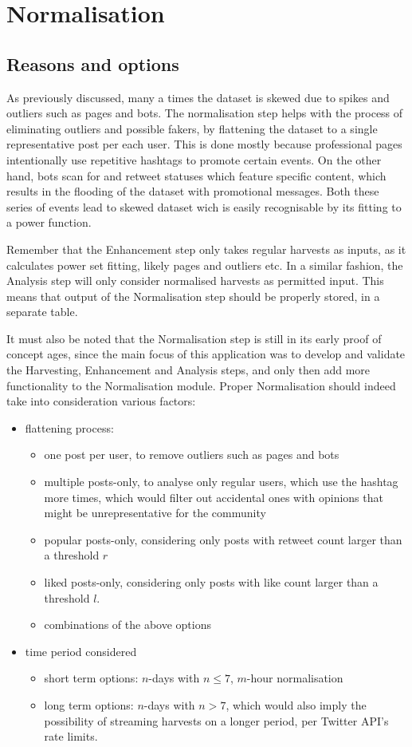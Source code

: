 \section{Normalisation}
\subsection{Reasons and options}
As previously discussed, many a times the dataset is skewed due to spikes and outliers such as pages and bots. The normalisation step helps with the process of eliminating outliers and possible fakers, by flattening the dataset to a single representative post per each user. This is done mostly because professional pages intentionally use repetitive hashtags to promote certain events. On the other hand, bots scan for and retweet statuses which feature specific content, which results in the flooding of the dataset with promotional messages. Both these series of events lead to skewed dataset wich is easily recognisable by its fitting to a power function.

Remember that the Enhancement step only takes regular harvests as inputs, as it calculates power set fitting, likely pages and outliers etc. In a similar fashion, the Analysis step will only consider normalised harvests as permitted input. This means that output of the Normalisation step should be properly stored, in a separate table.

It must also be noted that the Normalisation step is still in its early proof of concept ages, since the main focus of this application was to develop and validate the Harvesting, Enhancement and Analysis steps, and only then add more functionality to the Normalisation module. Proper Normalisation should indeed take into consideration various factors:

\begin{itemize}
\item flattening process: 
\begin{itemize}
\item one post per user, to remove outliers such as pages and bots
\item multiple posts-only, to analyse only regular users, which use the hashtag more times, which would filter out accidental ones with opinions that might be unrepresentative for the community
\item popular posts-only, considering only posts with retweet count larger than a threshold $r$
\item liked posts-only, considering only posts with like count larger than a threshold $l$.
\item combinations of the above options
\end{itemize}
\item time period considered
\begin{itemize}
\item short term options: $n$-days with $n\leq7$, $m$-hour normalisation
\item long term options: $n$-days with $n>7$, which would also imply the possibility of streaming harvests on a longer period, per Twitter API's rate limits.
\end{itemize} 
\end{itemize}


